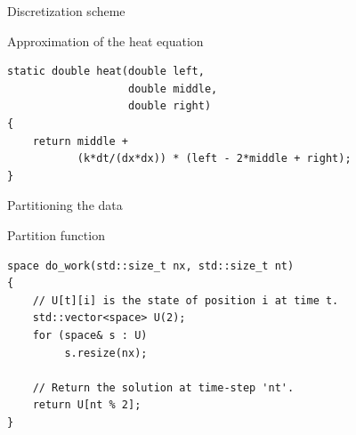 \documentclass[12pt,t]{beamer}
\begin{document}
\begin{frame}[fragile]{Discretization scheme}

\begin{center}
\end{center}

\begin{block}{Approximation of the heat equation}
\begin{lstlisting}
static double heat(double left,
                   double middle,
                   double right)
{
    return middle + 
           (k*dt/(dx*dx)) * (left - 2*middle + right);
}    
\end{lstlisting}
\end{block}

\end{frame}

\begin{frame}[fragile]{Partitioning the data}
\begin{center}
\end{center}

\begin{block}{Partition function}
\begin{lstlisting}
space do_work(std::size_t nx, std::size_t nt)
{
    // U[t][i] is the state of position i at time t.
    std::vector<space> U(2);
    for (space& s : U)
         s.resize(nx);

    // Return the solution at time-step 'nt'.
    return U[nt % 2];
}
\end{lstlisting}
\end{block}
\end{frame}
\end{document}
